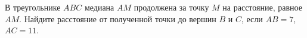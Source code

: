 \begin{ex}
	\begin{condition}
		В треугольнике \( ABC \) медиана \( AM \) продолжена за точку \( M \) на расстояние, равное \( AM \). Найдите расстояние от полученной точки до вершин \( B  \) и \( C\), если \( AB = 7\), \( AC = 11\).
	\end{condition}
\end{ex}